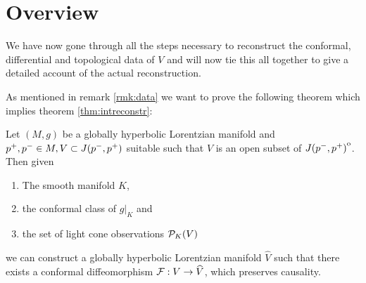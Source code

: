 \section{Overview}
We have now gone through all the steps necessary to reconstruct the conformal, differential and topological data of $V$ and will now tie this all together to give a detailed account of the actual reconstruction.

As mentioned in remark \ref{rmk:data} we want to prove the following theorem which implies theorem \ref{thm:intreconstr}:
\begin{theorem}
    Let $(M,g)$ be a globally hyperbolic Lorentzian manifold and $p^+,p^-\in M, V\subset J(p^-,p^+)$ suitable such that $V$ is an open subset of ${\kern0ptJ(p^-,p^+)}^{\mathrm{o}}$. Then given 
    \begin{enumerate}[label={\textnormal{(\arabic*)}}]
        \item The smooth manifold $K$,
        \item the conformal class of $g\rvert_K$ and
        \item the set of light cone observations ${\mathcal{P}}_K(V)$
    \end{enumerate}
    we can construct a globally hyperbolic Lorentzian manifold $\widehat{V}$ such that there exists a conformal diffeomorphism $\mathcal{F}:V\to \widehat{V}$, which preserves causality.
\end{theorem}
